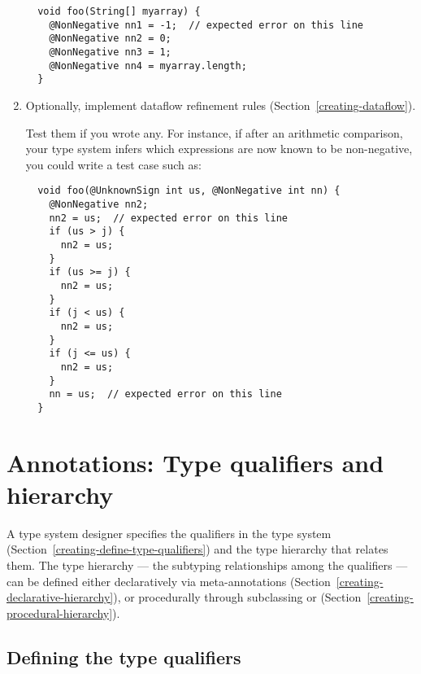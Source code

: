 \begin{enumerate}
\begin{Verbatim}
  void foo(String[] myarray) {
    @NonNegative nn1 = -1;  // expected error on this line
    @NonNegative nn2 = 0;
    @NonNegative nn3 = 1;
    @NonNegative nn4 = myarray.length;
  }
\end{Verbatim}

\item
  Optionally, implement dataflow refinement rules
  (Section~\ref{creating-dataflow}).

  Test them if you wrote any.
  For instance, if after an arithmetic comparison, your type system infers
  which expressions are now known to be non-negative, you could write a
  test case such as:

\begin{Verbatim}
  void foo(@UnknownSign int us, @NonNegative int nn) {
    @NonNegative nn2;
    nn2 = us;  // expected error on this line
    if (us > j) {
      nn2 = us;
    }
    if (us >= j) {
      nn2 = us;
    }
    if (j < us) {
      nn2 = us;
    }
    if (j <= us) {
      nn2 = us;
    }
    nn = us;  // expected error on this line
  }
\end{Verbatim}

\end{enumerate}




\section{Annotations: Type qualifiers and hierarchy\label{creating-typequals}}

A type system designer specifies the qualifiers in the type system (Section~\ref{creating-define-type-qualifiers})
and
the type hierarchy that relates them.
The type hierarchy --- the subtyping relationships among the qualifiers ---
can be defined either
declaratively via meta-annotations (Section~\ref{creating-declarative-hierarchy}), or procedurally through
subclassing  or
 (Section~\ref{creating-procedural-hierarchy}).


\subsection{Defining the type qualifiers\label{creating-define-type-qualifiers}}


